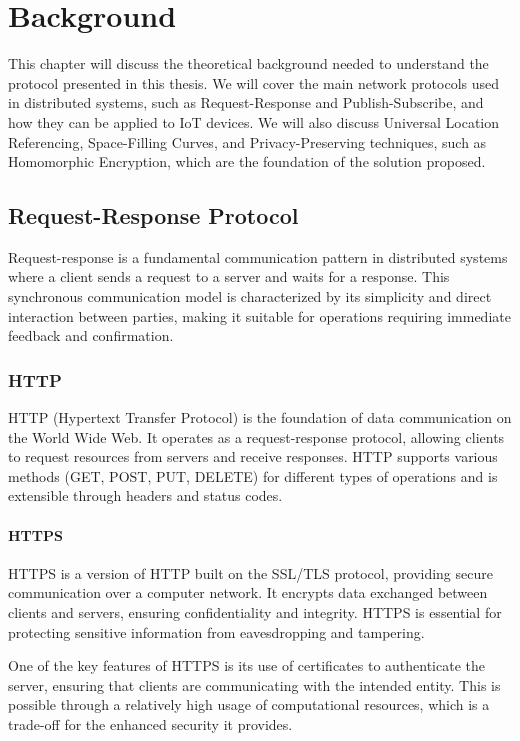 \chapter{Background} \label{chap:background}

This chapter will discuss the theoretical background needed to understand the protocol presented in this thesis. We will cover the main network protocols used in distributed systems, such as Request-Response and Publish-Subscribe, and how they can be applied to IoT devices. We will also discuss Universal Location Referencing, Space-Filling Curves, and Privacy-Preserving techniques, such as Homomorphic Encryption, which are the foundation of the solution proposed.

\section{Request-Response Protocol}

Request-response is a fundamental communication pattern in distributed systems where a client sends a request to a server and waits for a response. This synchronous communication model is characterized by its simplicity and direct interaction between parties, making it suitable for operations requiring immediate feedback and confirmation.

\subsection{HTTP}
HTTP (Hypertext Transfer Protocol) is the foundation of data communication on the World Wide Web. It operates as a request-response protocol, allowing clients to request resources from servers and receive responses. HTTP supports various methods (GET, POST, PUT, DELETE) for different types of operations and is extensible through headers and status codes.

\subsubsection{HTTPS}
HTTPS is a version of HTTP built on the SSL/TLS protocol, providing secure communication over a computer network. It encrypts data exchanged between clients and servers, ensuring confidentiality and integrity. HTTPS is essential for protecting sensitive information from eavesdropping and tampering.

One of the key features of HTTPS is its use of certificates to authenticate the server, ensuring that clients are communicating with the intended entity. This is possible through a relatively high usage of computational resources, which is a trade-off for the enhanced security it provides.

